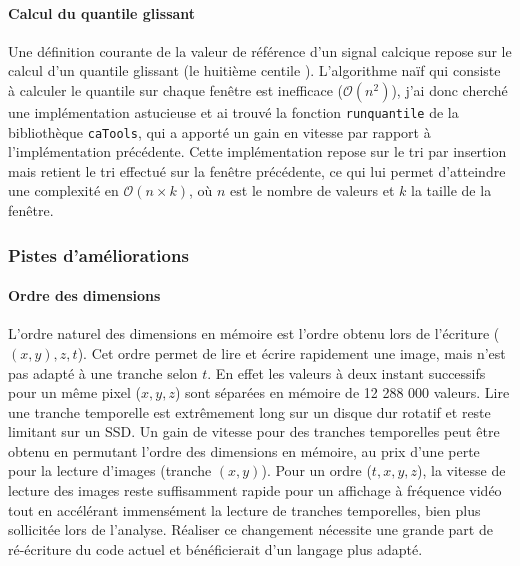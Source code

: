 \paragraph{Calcul du quantile glissant}
Une définition courante de la valeur de référence d'un signal calcique repose sur le calcul d'un quantile glissant (le huitième centile  \cite{dombeck_imaging_2007}). L'algorithme naïf qui consiste à calculer le quantile sur chaque fenêtre est inefficace ($\mathcal{O}(n^2)$), j'ai donc cherché une implémentation astucieuse et ai trouvé la fonction \verb|runquantile| de la bibliothèque \verb|caTools|, qui a apporté un gain en vitesse par rapport à l'implémentation précédente. Cette implémentation repose sur le tri par insertion mais retient le tri effectué sur la fenêtre précédente, ce qui lui permet d'atteindre une complexité en $\mathcal{O}(n\times k)$, où $n$ est le nombre de valeurs et $k$ la taille de la fenêtre.



\subsubsection{Pistes d'améliorations}

\paragraph{Ordre des dimensions}
L'ordre naturel des dimensions en mémoire est l'ordre obtenu lors de l'écriture ($(x,y),z,t$). Cet ordre permet de lire et écrire rapidement une image, mais n'est pas adapté à une tranche selon $t$. En effet les valeurs à deux instant successifs pour un même pixel ($x,y,z$) sont séparées en mémoire de 12 288 000 valeurs. Lire une tranche temporelle est extrêmement long sur un disque dur rotatif et reste limitant sur un SSD. Un gain de vitesse pour des tranches temporelles peut être obtenu en permutant l'ordre des dimensions en mémoire, au prix d'une perte pour la lecture d'images (tranche $(x,y)$). Pour un ordre ($t,x,y,z$), la vitesse de lecture des images reste suffisamment rapide pour un affichage à fréquence vidéo tout en accélérant immensément la lecture de tranches temporelles, bien plus sollicitée lors de l'analyse. Réaliser ce changement nécessite une grande part de ré-écriture du code actuel et bénéficierait d'un langage plus adapté.

